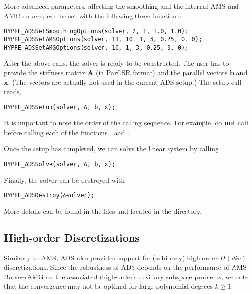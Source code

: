 More advanced parameters, affecting the smoothing and the internal AMS and AMG
 solvers, can be set with the following three functions:
\begin{display}\begin{verbatim}
HYPRE_ADSSetSmoothingOptions(solver, 2, 1, 1.0, 1.0);
HYPRE_ADSSetAMSOptions(solver, 11, 10, 1, 3, 0.25, 0, 0);
HYPRE_ADSSetAMGOptions(solver, 10, 1, 3, 0.25, 0, 0);
\end{verbatim}\end{display}

After the above calls, the solver is ready to be constructed.  The user has to
provide the stiffness matrix ${\mathbf A}$ (in ParCSR format) and the \hypre{}
parallel vectors ${\mathbf b}$ and ${\mathbf x}$. (The vectors are actually not
used in the current ADS setup.) The setup call reads,
\begin{display}\begin{verbatim}
HYPRE_ADSSetup(solver, A, b, x);
\end{verbatim}\end{display}
It is important to note the order of the calling sequence. For example, do {\bf not}
call  before calling each of the functions 
, 
and .

\noindent
Once the setup has completed, we can solve the linear system by calling
\begin{display}\begin{verbatim}
HYPRE_ADSSolve(solver, A, b, x);
\end{verbatim}\end{display}

\noindent
Finally, the solver can be destroyed with
\begin{display}\begin{verbatim}
HYPRE_ADSDestroy(&solver);
\end{verbatim}\end{display}

\noindent
More details can be found in the files  and 
located in the  directory.

\subsection{High-order Discretizations}
Similarly to AMS, ADS also provides support for (arbitrary) high-order $H(div)$
discretizations. Since the robustness of ADS depends on the performance of AMS
BoomerAMG on the associated (high-order) auxiliary subspace problems, we note
that the convergence may not be optimal for large polynomial degrees $k \geq 1$.


